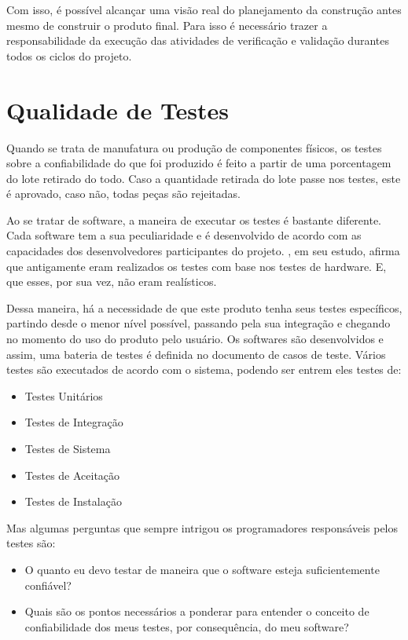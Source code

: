 Com isso, é possível alcançar uma visão real do planejamento da construção
antes mesmo de construir o produto final. Para isso é necessário trazer
a responsabilidade da execução das atividades de verificação e validação
durantes todos os ciclos do projeto.

\section{Qualidade de Testes}
\label{sec:qualidade-testes}
Quando se trata de manufatura ou produção de componentes físicos, os testes
sobre a confiabilidade do que foi produzido é feito a partir de uma porcentagem
do lote retirado do todo. Caso a quantidade retirada do lote passe nos testes,
este é aprovado, caso não, todas peças são rejeitadas.

Ao se tratar de software, a maneira de executar os testes é bastante diferente.
Cada software tem a sua peculiaridade e é desenvolvido de acordo com as
capacidades dos desenvolvedores participantes do projeto. \cite{e08}, em seu estudo,
afirma que antigamente eram realizados os testes com base nos testes de hardware.
E, que esses, por sua vez, não eram realísticos.

Dessa maneira, há a necessidade de que este produto tenha seus testes específicos,
partindo desde o menor nível possível, passando pela sua integração e chegando
no momento do uso do produto pelo usuário.
Os softwares são desenvolvidos e assim, uma bateria de testes é definida no
documento de casos de teste. Vários testes são  executados de acordo com o sistema,
podendo ser entrem eles testes de:

\begin{itemize}
\item Testes Unitários
\item Testes de Integração
\item Testes de Sistema
\item Testes de Aceitação
\item Testes de Instalação
\end{itemize}

Mas algumas perguntas que sempre intrigou os programadores responsáveis pelos testes são:

\begin{itemize}
\item O quanto eu devo testar de maneira que o software esteja suficientemente
confiável?
\item Quais são os pontos necessários a ponderar para entender o conceito
de confiabilidade dos meus testes, por consequência, do meu software?
\end{itemize}

